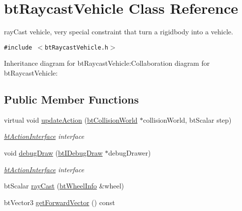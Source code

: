 \hypertarget{classbt_raycast_vehicle}{
\section{btRaycastVehicle Class Reference}
\label{classbt_raycast_vehicle}
}
rayCast vehicle, very special constraint that turn a rigidbody into a vehicle.  


{\tt \#include $<$btRaycastVehicle.h$>$}

Inheritance diagram for btRaycastVehicle:Collaboration diagram for btRaycastVehicle:\subsection*{Public Member Functions}
\begin{CompactItemize}
\item 
\hypertarget{classbt_raycast_vehicle_22d127e6b87137131485cdebd65ea5af}{
virtual void \hyperlink{classbt_raycast_vehicle_22d127e6b87137131485cdebd65ea5af}{updateAction} (\hyperlink{classbt_collision_world}{btCollisionWorld} $\ast$collisionWorld, btScalar step)}
\label{classbt_raycast_vehicle_22d127e6b87137131485cdebd65ea5af}

\begin{CompactList}\small\item\em \hyperlink{classbt_action_interface}{btActionInterface} interface \item\end{CompactList}\item 
\hypertarget{classbt_raycast_vehicle_b5dfeb4a57f735f6fb069bfc5654428d}{
void \hyperlink{classbt_raycast_vehicle_b5dfeb4a57f735f6fb069bfc5654428d}{debugDraw} (\hyperlink{classbt_i_debug_draw}{btIDebugDraw} $\ast$debugDrawer)}
\label{classbt_raycast_vehicle_b5dfeb4a57f735f6fb069bfc5654428d}

\begin{CompactList}\small\item\em \hyperlink{classbt_action_interface}{btActionInterface} interface \item\end{CompactList}\item 
btScalar \hyperlink{classbt_raycast_vehicle_53451c4e3495561f3f078b2041ef04be}{rayCast} (\hyperlink{structbt_wheel_info}{btWheelInfo} \&wheel)
\item 
\hypertarget{classbt_raycast_vehicle_2aaaf0cc32e2f636b898b1856eb84fda}{
btVector3 \hyperlink{classbt_raycast_vehicle_2aaaf0cc32e2f636b898b1856eb84fda}{getForwardVector} () const }
\label{classbt_raycast_vehicle_2aaaf0cc32e2f636b898b1856eb84fda}


\end{CompactItemize}
